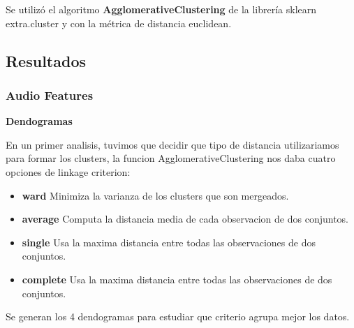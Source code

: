 Se utilizó el algoritmo \textbf{AgglomerativeClustering} de la librería sklearn extra.cluster y con la métrica de distancia euclidean.

\subsection{Resultados}
\subsubsection{Audio Features}
\begin{center}\textbf{Dendogramas}\end{center}


En un primer analisis, tuvimos que decidir que tipo de distancia utilizariamos para formar los clusters, la funcion AgglomerativeClustering nos daba cuatro opciones de linkage criterion:

\begin{itemize}
  \item \textbf{ward} Minimiza la varianza de los clusters que son mergeados.
  \item \textbf{average} Computa la distancia media de cada observacion de dos conjuntos.
  \item \textbf{single} Usa la maxima distancia entre todas las observaciones de dos conjuntos.
  \item\textbf{complete} Usa la maxima distancia entre todas las observaciones de dos conjuntos.
\end{itemize}

Se generan los 4 dendogramas para estudiar que criterio agrupa mejor los datos.

